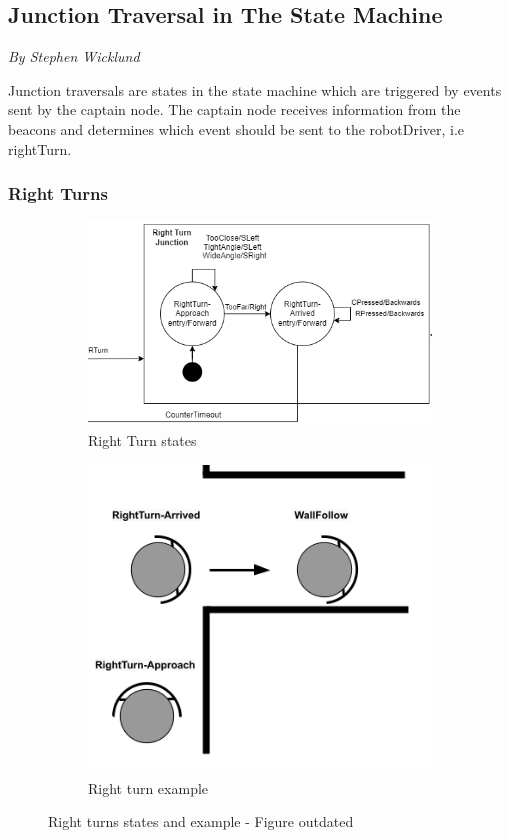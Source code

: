 \documentclass[12pt]{report}
\newcommand{\sectionAuthor}[1]{{\small\vspace{-1em}\textit{#1}}\bigskip\par}
\begin{document}
\subsection{Junction Traversal in The State Machine}
\sectionAuthor{By Stephen Wicklund}

Junction traversals are states in the state machine which are triggered by events sent by the captain node. The captain node receives information from the beacons and determines which event should be sent to the robotDriver, i.e rightTurn.
\subsubsection{Right Turns}

\begin{figure}[H]
  \begin{subfigure}[b]{0.6\textwidth}
    \includegraphics[width=\textwidth]{images/RightTurnZoomedIn.png}
    \caption{Right Turn states}
    \label{fig:f1}
  \end{subfigure}
  \hfill
  \begin{subfigure}[b]{0.5\textwidth}
    \includegraphics[width=\textwidth]{images/RightTurns.png}
    \caption{Right turn example}
    \label{fig:f2}
  \end{subfigure}
  \caption{Right turns states and example - Figure outdated}
\end{figure}
\end{document}
